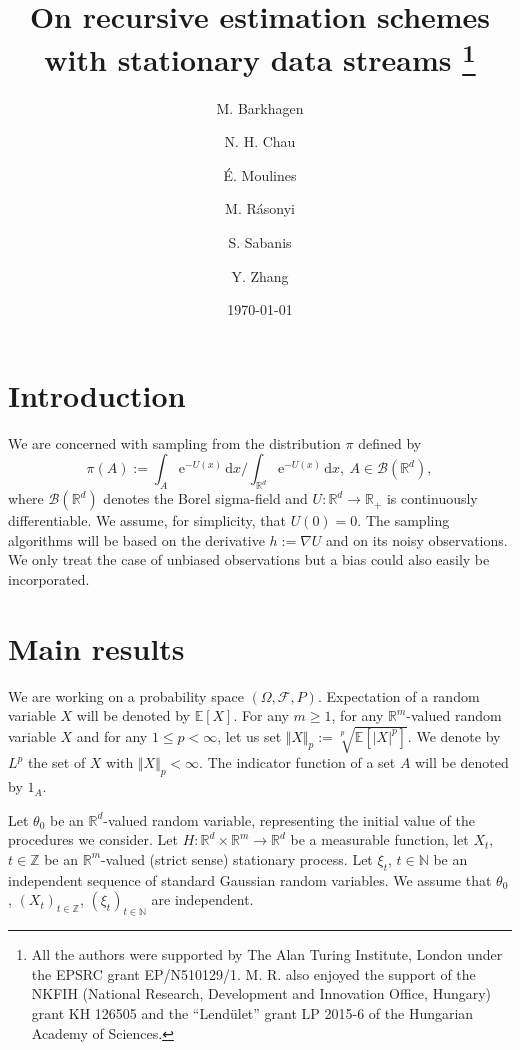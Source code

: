 \documentclass[a4paper,draft]{article}
\def\rmd{\mathrm{d}}
\def\rme{\mathrm{e}}
\def\PE{\mathbb{E}}
\begin{document}
\title{On recursive estimation schemes\\ with stationary data streams
\thanks{All the authors
were supported
by The Alan Turing Institute, London under the EPSRC grant EP/N510129/1.
M. R. also enjoyed the support of the NKFIH (National Research, Development and Innovation Office, Hungary)
grant KH 126505 and the ``Lend\"ulet'' grant LP 2015-6 of the
Hungarian Academy of Sciences.}}

\author{M. Barkhagen \and N. H. Chau \and \'E. Moulines \and
M. R\'asonyi \and S. Sabanis \and Y. Zhang}

\date{\today}

\maketitle

\begin{abstract}

\end{abstract}

\section{Introduction}

We are concerned with sampling from the distribution $\pi$ defined by
$$
\pi(A):=\int_A \rme^{-U(x)}\, \rmd x/\int_{\mathbb{R}^d} \rme^{-U(x)}\, \rmd x,\
A\in\mathcal{B}(\mathbb{R}^d),
$$
where $\mathcal{B}(\mathbb{R}^d)$ denotes the Borel sigma-field
and $U:\mathbb{R}^d\to\mathbb{R}_+$ is continuously
differentiable. We assume, for simplicity,
that $U(0)=0$. The sampling algorithms will be based on
the derivative $h:=\nabla U$ and on its noisy observations.
We only treat the case of unbiased observations but a bias
could also easily be incorporated.

\section{Main results}

We are working on a probability space $(\Omega,\mathcal{F},P)$.
Expectation of
a random variable $X$ will be denoted by $\PE[X]$.
For any $m\geq 1$, for any $\mathbb{R}^m$-valued random variable $X$ and for any $1\leq p<\infty$, let us set
$\Vert X\Vert_p:=\sqrt[p]{\PE[|X|^p]}$. We denote by $L^p$ the set of $X$ with $\Vert X\Vert_p<\infty$.
The indicator function of a set $A$ will be denoted by $1_A$.


Let $\theta_0$ be an $\mathbb{R}^d$-valued random variable, representing
the initial value of the procedures we consider.
Let $H:\mathbb{R}^d\times\mathbb{R}^m\to\mathbb{R}^d$ be a measurable
function, let $X_t$, $t\in\mathbb{Z}$ be an $\mathbb{R}^m$-valued (strict sense) stationary process.
Let $\xi_t$, $t\in\mathbb{N}$ be an independent
sequence of standard Gaussian random variables. We assume that $\theta_0$, $(X_t)_{t\in\mathbb{Z}}$,
$(\xi_t)_{t\in\mathbb{N}}$ are independent.
\end{document}
